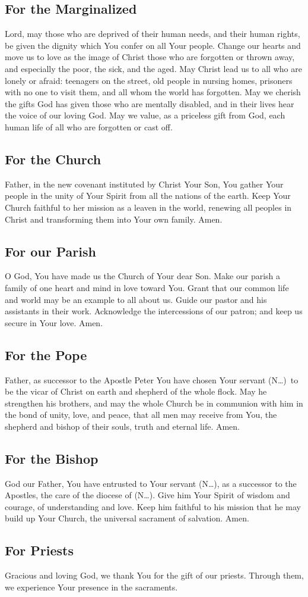 \documentclass[12pt]{article}
\newcommand{\prayertitle}[1]{\subsection{#1}}
\newcommand{\insertname}{(N\dots)}
\begin{document}
\prayertitle{For the Marginalized}
Lord, may those who are deprived of their human needs, and their human rights, be given the dignity which You confer on all Your people.
Change our hearts and move us to love as the image of Christ those who are forgotten or thrown away, and especially the poor, the sick, and the aged.
May Christ lead us to all who are lonely or afraid: teenagers on the street, old people in nursing homes, prisoners with no one to visit them, and all whom the world has forgotten.
May we cherish the gifts God has given those who are mentally disabled,
and in their lives hear the voice of our loving God.
May we value, as a priceless gift from God, each human life of all who are forgotten or cast off.

\prayertitle{For the Church}
Father, in the new covenant instituted by Christ Your Son, You gather Your people in the unity of Your Spirit from all the nations of the earth.
Keep Your Church faithful to her mission as a leaven in the world, renewing all peoples in Christ and transforming them into Your own family.
Amen.

\prayertitle{For our Parish}
O God, You have made us the Church of Your dear Son.
Make our parish a family of one heart and mind in love toward You.
Grant that our common life and world may be an example to all about us.
Guide our pastor and his assistants in their work.
Acknowledge the intercessions of our patron; and keep us secure in Your love.
Amen.

\prayertitle{For the Pope}
Father, as successor to the Apostle Peter You have chosen Your servant \insertname\ to be the vicar of Christ on earth and shepherd of the whole flock.
May he strengthen his brothers, and may the whole Church be in communion with him in the bond of unity, love, and peace, that all men may receive from You, the shepherd and bishop of their souls, truth and eternal life.
Amen.

\prayertitle{For the Bishop}
God our Father, You have entrusted to Your servant \insertname, as a successor to the Apostles, the care of the diocese of \insertname.
Give him Your Spirit of wisdom and courage, of understanding and love.
Keep him faithful to his mission that he may build up Your Church, the universal sacrament of salvation.
Amen.

\prayertitle{For Priests}
Gracious and loving God, we thank You for the gift of our priests.
Through them, we experience Your presence in the sacraments.
\end{document}
